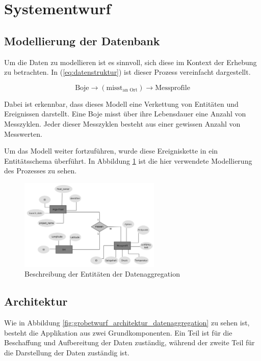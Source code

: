 \section{Systementwurf}

\subsection{Modellierung der Datenbank}

Um die Daten zu modellieren ist es sinnvoll, sich diese im Kontext der Erhebung zu betrachten. In (\ref{eq:datenstruktur}) ist dieser Prozess vereinfacht dargestellt.

\begin{equation}
    \mbox{Boje} \to (\mbox{misst}_{\mbox{an Ort}}) \to \mbox{Messprofile}\label{eq:datenstruktur}
\end{equation}

Dabei ist erkennbar, dass dieses Modell eine Verkettung von Entitäten und Ereignissen darstellt. Eine Boje misst über ihre Lebensdauer eine Anzahl von Messzyklen. Jeder dieser Messzyklen besteht aus einer gewissen Anzahl von Messwerten.

Um das Modell weiter fortzuführen, wurde diese Ereigniskette in ein Entitätsschema überführt. In Abbildung \ref{fig:ERM} ist die hier verwendete Modellierung des Prozesses zu sehen. 

\begin{figure}[h!]
    \centering
    \includegraphics[width=0.6\textwidth,clip=true,trim=0pt 0pt 0pt 0pt]{pix/erm.png}
    \caption{Beschreibung der Entitäten der Datenaggregation}
    \label{fig:ERM}
\end{figure}


\subsection{Architektur}
    

Wie in Abbildung \ref{fig:grobetwurf_architektur_datenaggregation} zu sehen ist, besteht die Applikation aus zwei Grundkomponenten. Ein Teil ist für die Beschaffung und Aufbereitung der Daten zuständig, während der zweite Teil für die Darstellung der Daten zuständig ist. 

